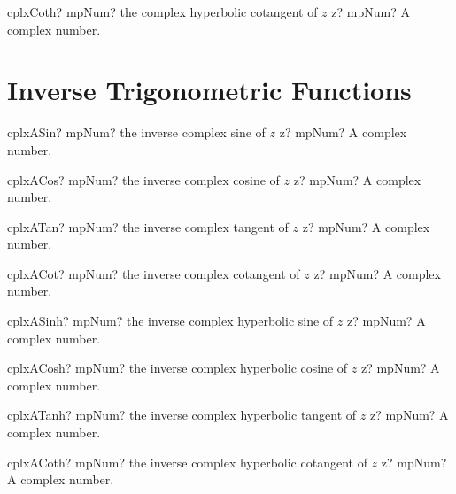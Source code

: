 \documentclass[12pt,a4paper,openany]{book}
\begin{document}
\begin{mpFunctionsExtract}
\mpFunctionOne
{cplxCoth? mpNum? the complex hyperbolic cotangent of $z$}
{z? mpNum? A complex number.}
\end{mpFunctionsExtract}

\section{Inverse Trigonometric Functions}

\begin{mpFunctionsExtract}
\mpFunctionOne
{cplxASin? mpNum? the inverse complex sine of $z$}
{z? mpNum? A complex number.}
\end{mpFunctionsExtract}

\begin{mpFunctionsExtract}
\mpFunctionOne
{cplxACos? mpNum? the inverse complex cosine of $z$}
{z? mpNum? A complex number.}
\end{mpFunctionsExtract}

\begin{mpFunctionsExtract}
\mpFunctionOne
{cplxATan? mpNum? the inverse complex tangent of $z$}
{z? mpNum? A complex number.}
\end{mpFunctionsExtract}

\begin{mpFunctionsExtract}
\mpFunctionOne
{cplxACot? mpNum? the inverse complex cotangent of $z$}
{z? mpNum? A complex number.}
\end{mpFunctionsExtract}

\begin{mpFunctionsExtract}
\mpFunctionOne
{cplxASinh? mpNum? the inverse complex hyperbolic sine of $z$}
{z? mpNum? A complex number.}
\end{mpFunctionsExtract}

\begin{mpFunctionsExtract}
\mpFunctionOne
{cplxACosh? mpNum? the inverse complex hyperbolic cosine of $z$}
{z? mpNum? A complex number.}
\end{mpFunctionsExtract}

\begin{mpFunctionsExtract}
\mpFunctionOne
{cplxATanh? mpNum? the inverse complex hyperbolic tangent of $z$}
{z? mpNum? A complex number.}
\end{mpFunctionsExtract}

\begin{mpFunctionsExtract}
\mpFunctionOne
{cplxACoth? mpNum? the inverse complex hyperbolic cotangent of $z$}
{z? mpNum? A complex number.}
\end{mpFunctionsExtract}
\end{document}
